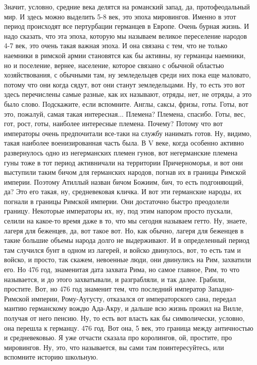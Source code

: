 Значит, условно, средние века делятся на
романский запад, да, протофеодальный мир. И здесь можно выделить 5-8 век, это
эпоха мировингов. Именно в этот период происходят все
пертурбации германцев в Европе. Очень бурная жизнь. И надо сказать, что эта
эпоха, которую мы называем великое переселение народов 4-7 век, это очень такая
важная эпоха. И она связана с тем, что не только наемники в римской армии
становятся как бы активны, ну германцы наемники, но и поселение, вернее,
население, которое связано с обычной областью хозяйствования, с обычными там, ну
земледельцев среди них пока еще маловато, потому что они когда сядут, вот они
станут земледельцами. Ну, то есть это вот здесь перечислены самые разные, как их
называют, отряды, нет, не отряды, а это было слово. Подскажите, если вспомните.
Англы, саксы, фризы, готы. Готы, вот это, пожалуй, самая такая интересная...
Племена? Племена, спасибо. Готы, вес, гот, рост, готы, наиболее интересные
племена. Почему? Потому что вот императоры очень предпочитали все-таки на службу
нанимать готов. Ну, видимо, такая наиболее военизированная часть была. В V веке,
когда особенно активно развернулось одно из негерманских племен гунов, вот
негерманские племена гуны тоже в тот период активничали на территории
Причерноморья, и вот они выступили таким бичом для германских народов, погнав их
в границы Римской империи. Поэтому Атиллый назван бичом Божиим, бич, то есть
подгоняющий, да? Это его такая, ну, средневековая кличка. И вот эти германские
народы, их погнали в границы Римской империи. Они достаточно быстро преодолели
границу. Некоторые императоры их, ну, под этим напором просто пускали, селили на
какое-то время даже в то, что мы сегодня называем гетто. Ну, знаете, лагеря для
беженцев, да, вот такое вот. Но, как обычно, лагеря для беженцев в такие большие
объемы народа долго не выдерживают. И в определенный период там случился бунт в
одном из лагерей, и войско двинулось, вот, то есть там и войско, и просто, так
скажем, невоенные люди, они двинулись на Рим, захватили его. Но 476 год,
знаменитая дата захвата Рима, но самое главное, Рим, то что называется, и до
этого захватывали, и разграбляли, и так далее. Грабили, простите. Вот, но 476
год знаменит тем, что последний император Западно-Римской империи, Рому-Аугусту,
отказался от императорского сана, передал мантию германскому вождю Ада-Акру, и
дальше всю жизнь прожил на Вилле, получая от него пенсию. Ну, то есть вот власть
как бы символически, условно, она перешла к германцу. 476 год. Вот она, 5 век,
это граница между античностью и средневековью. Я уже отчасти сказала про
королингов, ой, простите, про мировингов. Ну, это, что называется, вы сами там
поинтересуйтесь, или вспомните историю школьную. 


